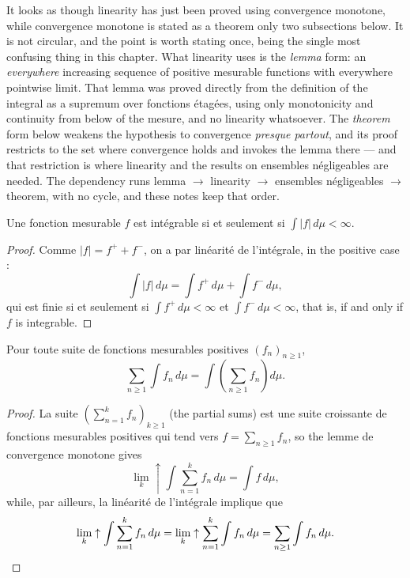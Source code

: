 \begin{remark}
  It looks as though linearity has just been proved using convergence monotone, while
  convergence monotone is stated as a theorem only two subsections below. It is not
  circular, and the point is worth stating once, being the single most confusing
  thing in this chapter. What linearity uses is the \emph{lemma} form: an
  \emph{everywhere} increasing sequence of positive mesurable functions with
  everywhere pointwise limit. That lemma was proved directly from the definition of
  the integral as a supremum over fonctions étagées, using only monotonicity and
  continuity from below of the mesure, and no linearity whatsoever. The
  \emph{theorem} form below weakens the hypothesis to convergence \textit{presque
  partout}, and its proof restricts to the set where convergence holds and invokes
  the lemma there --- and that restriction is where linearity and the results on
  ensembles négligeables are needed. The dependency runs lemma $\to$ linearity $\to$
  ensembles négligeables $\to$ theorem, with no cycle, and these notes keep that
  order.
\end{remark}

\begin{corollary}
  Une fonction mesurable $f$ est intégrable si et seulement si $\int |f| \, d\mu <
  \infty$.
\end{corollary}

\begin{proof}
  Comme $|f| = f^{+} + f^{-}$, on a par linéarité de l'intégrale, in the positive
  case :
  \[
    \int |f| \, d\mu = \int f^{+} \, d\mu + \int f^{-} \, d\mu ,
  \]
  qui est finie si et seulement si $\int f^{+} \, d\mu < \infty$ et $\int f^{-} \,
  d\mu < \infty$, that is, if and only if $f$ is integrable.
\end{proof}

\begin{corollary}
  Pour toute suite de fonctions mesurables positives $(f_{n})_{n \geq 1}$,
  \[
    \sum_{n \geq 1} \int f_{n} \, d\mu = \int \left( \sum_{n \geq 1} f_{n} \right)
      d\mu .
  \]
\end{corollary}

\begin{proof}
  La suite $\left( \sum_{n=1}^{k} f_{n} \right)_{k \geq 1}$ (the partial sums) est
  une suite croissante de fonctions mesurables positives qui tend vers $f = \sum_{n
  \geq 1} f_{n}$, so the lemme de convergence monotone gives
  \[
    \lim_{k} \uparrow \int \sum_{n=1}^{k} f_{n} \, d\mu = \int f \, d\mu ,
  \]
  while, par ailleurs, la linéarité de l'intégrale implique que
  \[
    \lim_{k} \uparrow \int \sum_{n=1}^{k} f_{n} \, d\mu
    = \lim_{k} \uparrow \sum_{n=1}^{k} \int f_{n} \, d\mu
    = \sum_{n \geq 1} \int f_{n} \, d\mu . \qedhere
  \]
\end{proof}

